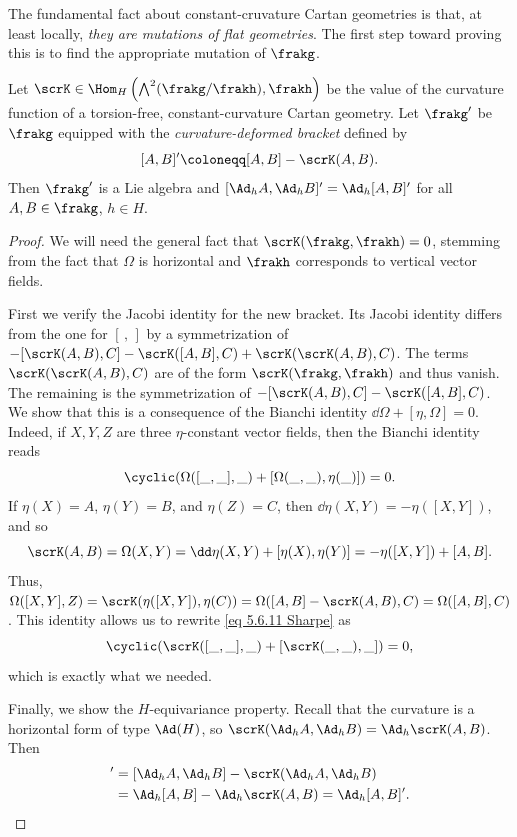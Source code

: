 The fundamental fact about constant-cruvature Cartan geometries is that, at least locally, \emph{they are mutations of flat geometries}. The first step toward proving this is to find the appropriate mutation of $\frakg$.

\begin{prop}\label{prop 5.6.8 Sharpe}
    Let $\scrK\in \Hom_H\left(\bigwedge\nolimits^2(\frakg\slash\frakh),\frakh\right)$ be the value of the curvature function of a torsion-free, constant-curvature Cartan geometry. Let $\frakg'$ be $\frakg$ equipped with the \emph{curvature-deformed bracket} defined by 
    \[[A,B]'\coloneqq [A,B]-\scrK(A,B).\label{eq deformed bracket}\] 
    Then $\frakg'$ is a Lie algebra and $[\Ad_h A,\Ad_h B]'=\Ad_h [A,B]'$ for all $A,B\in \frakg$, $h\in H$.
\end{prop}
\begin{proof}
    We will need the general fact that $\scrK(\frakg,\frakh)=0$, stemming from the fact that $\Omega$ is horizontal and $\frakh$ corresponds to vertical vector fields.

    First we verify the Jacobi identity for the new bracket. Its Jacobi identity differs from the one for $[\,,\,]$ by a symmetrization of $-[\scrK(A,B),C]-\scrK([A,B],C)+\scrK(\scrK(A,B),C)$. The terms $\scrK(\scrK(A,B),C)$ are of the form $\scrK(\frakg,\frakh)$ and thus vanish. The remaining is the symmetrization of $-[\scrK(A,B),C]-\scrK([A,B],C)$. We show that this is a consequence of the Bianchi identity $\dd \Omega+[\eta,\Omega]=0$. Indeed, if $X,Y,Z$ are three $\eta$-constant vector fields, then the Bianchi identity reads 
    \[\cyclic(\Omega([\_,\_],\_)+[\Omega(\_,\_),\eta(\_)])=0.\label{eq 5.6.11 Sharpe}\]
    If $\eta(X)=A$, $\eta(Y)=B$, and $\eta(Z)=C$, then $\dd\eta(X,Y)=-\eta([X,Y])$, and so 
    \[\scrK(A,B)=\Omega(X,Y)=\dd\eta(X,Y)+[\eta(X),\eta(Y)]=-\eta([X,Y])+[A,B].\]
    Thus, $\Omega([X,Y],Z)=\scrK(\eta([X,Y]),\eta(C))=\Omega([A,B]-\scrK(A,B),C)=\Omega([A,B],C)$. This identity allows us to rewrite \eqref{eq 5.6.11 Sharpe} as 
    \[\cyclic(\scrK([\_,\_],\_)+[\scrK(\_,\_),\_])=0,\]
    which is exactly what we needed.

    Finally, we show the $H$-equivariance property. Recall that the curvature is a horizontal form of type $\Ad(H)$, so $\scrK(\Ad_h A,\Ad_h B)=\Ad_h \scrK(A,B)$. Then 
    \begin{align}
        [\Ad_h A,\Ad_h B]'&=[\Ad_h A,\Ad_h B]-\scrK(\Ad_h A,\Ad_h B)\notag\\
        &=\Ad_h [A,B]-\Ad_h \scrK(A,B)=\Ad_h[A,B]'.
    \end{align}
\end{proof}


